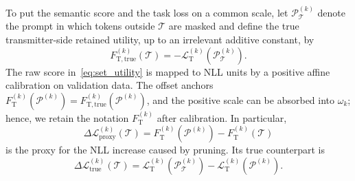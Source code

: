 \documentclass[journal]{IEEEtran}
\begin{document}
To put the semantic score and the task loss on a common scale, let $\mathcal P_{\mathcal T}^{(k)}$ denote the prompt in which tokens outside $\mathcal T$ are masked and define the true transmitter-side retained utility, up to an irrelevant additive constant, by
\begin{equation}
F_{\mathrm T,\mathrm{true}}^{(k)}(\mathcal T)
=-\mathcal L_{\mathrm T}^{(k)}(\mathcal P_{\mathcal T}^{(k)}).
\label{eq:true_transmitter_utility}
\end{equation}
The raw score in~\eqref{eq:set_utility} is mapped to NLL units by a positive affine calibration on validation data. The offset anchors $F_{\mathrm T}^{(k)}(\mathcal P^{(k)})=F_{\mathrm T,\mathrm{true}}^{(k)}(\mathcal P^{(k)})$, and the positive scale can be absorbed into $\omega_k$; hence, we retain the notation $F_{\mathrm T}^{(k)}$ after calibration. In particular,
\begin{equation}
\Delta\mathcal L_{\mathrm{proxy}}^{(k)}(\mathcal T)
=F_{\mathrm T}^{(k)}(\mathcal P^{(k)})
-F_{\mathrm T}^{(k)}(\mathcal T)
\label{eq:calibrated_proxy_loss}
\end{equation}
is the proxy for the NLL increase caused by pruning. Its true counterpart is
\begin{equation}
\Delta\mathcal L_{\mathrm{true}}^{(k)}(\mathcal T)
=\mathcal L_{\mathrm T}^{(k)}(\mathcal P_{\mathcal T}^{(k)})
-\mathcal L_{\mathrm T}^{(k)}(\mathcal P^{(k)}).
\label{eq:true_pruning_loss}
\end{equation}
\end{document}
